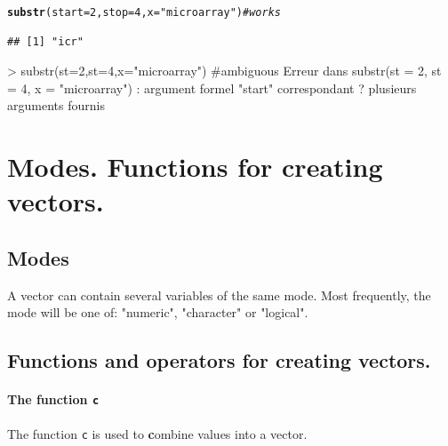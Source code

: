 \documentclass[10pt]{article}\usepackage[]{graphicx}\usepackage[]{color}
\makeatletter
\newcommand{\hlnum}[1]{\textcolor[rgb]{0.686,0.059,0.569}{#1}}%
\newcommand{\hlstr}[1]{\textcolor[rgb]{0.192,0.494,0.8}{#1}}%
\newcommand{\hlcom}[1]{\textcolor[rgb]{0.678,0.584,0.686}{\textit{#1}}}%
\newcommand{\hlstd}[1]{\textcolor[rgb]{0.345,0.345,0.345}{#1}}%
\newcommand{\hlkwc}[1]{\textcolor[rgb]{0.333,0.667,0.333}{#1}}%
\newcommand{\hlkwd}[1]{\textcolor[rgb]{0.737,0.353,0.396}{\textbf{#1}}}%
\newenvironment{kframe}{%
 \def\at@end@of@kframe{}%
 \ifinner\ifhmode%
  \def\at@end@of@kframe{\end{minipage}}%
  \begin{minipage}{\columnwidth}%
 \fi\fi%
 \def\FrameCommand##1{\hskip\@totalleftmargin \hskip-\fboxsep
 \colorbox{shadecolor}{##1}\hskip-\fboxsep
     \hskip-\linewidth \hskip-\@totalleftmargin \hskip\columnwidth}%
 \MakeFramed {\advance\hsize-\width
   \@totalleftmargin\z@ \linewidth\hsize
   \@setminipage}}%
 {\par\unskip\endMakeFramed%
 \at@end@of@kframe}
\newenvironment{knitrout}{}{} %
\newcommand{\Rfunction}[1]{{\texttt{#1}}}
\makeatother
\begin{document}
\begin{knitrout}
\color{fgcolor}\begin{kframe}
\begin{alltt}
\hlkwd{substr}\hlstd{(}\hlkwc{start}\hlstd{=}\hlnum{2}\hlstd{,}\hlkwc{stop}\hlstd{=}\hlnum{4}\hlstd{,}\hlkwc{x}\hlstd{=}\hlstr{"microarray"}\hlstd{)} \hlcom{# works}
\end{alltt}
\begin{verbatim}
## [1] "icr"
\end{verbatim}
\end{kframe}
\end{knitrout}
\begin{Soutput}
> substr(st=2,st=4,x="microarray")            #ambiguous
Erreur dans substr(st = 2, st = 4, x = "microarray") :
  argument formel "start" correspondant ? plusieurs arguments fournis
\end{Soutput}
\medskip


\section{Modes. Functions for creating vectors.}
\subsection{Modes}
A vector can contain several variables of the same mode. Most frequently, the mode will be one of: "numeric", "character" or "logical".
\subsection{Functions and operators for creating vectors.}
\paragraph{The function \Rfunction{c}}
The function \Rfunction{c} is used to \textbf{c}ombine values into a vector.
\end{document}
